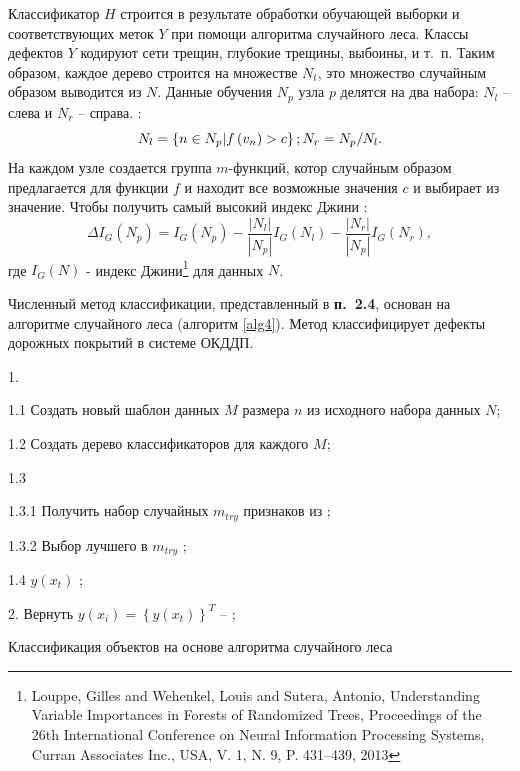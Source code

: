 Классификатор $H$ строится в результате обработки обучающей выборки и соответствующих меток $Y$ при помощи алгоритма случайного леса. Классы дефектов $Y$ кодируют сети трещин, глубокие трещины, выбоины, и т.~п. Таким образом, каждое дерево строится на множестве $N_t$, это множество случайным образом выводится из $N$. Данные обучения $N_p$ узла $p$ делятся на два набора: $N_l$ -- слева и $N_r$ -- справа. :
\begin{equation}\label{eq11}
N_l = \left\{n \in N_p | f\left(v_n\right) > c\right\};  \\
N_r=N_p / N_l.
\end{equation}
На каждом узле создается группа $m$-функций, котор случайным образом предлагается для функции $ f $ и находит все возможные значения $ c $ и  выбирает из  значение. Чтобы получить самый высокий индекс Джини :
\begin{equation}\label{eq12}
\Delta I_G\left(N_p\right)=I_G\left(N_p\right) - \frac{|N_l|}{|N_p|}I_G\left(N_l\right) - \frac{|N_r|}{|N_p|}I_G\left(N_r\right),
\end{equation} где $I_G\left(N\right)$ - индекс Джини\footnote {Louppe, Gilles and Wehenkel, Louis and Sutera, Antonio, Understanding Variable Importances in Forests of Randomized Trees, Proceedings of the 26th International Conference on Neural Information Processing Systems, Curran Associates Inc., USA, V. 1, N. 9, P. 431--439, 2013} для данных  $N$.


Численный метод классификации, представленный в \textbf{п.~2.4}, основан на алгоритме случайного леса (алгоритм \ref{alg4}).  Метод классифицирует дефекты дорожных покрытий в системе ОКДДП.
\begin{algorithm}[ht!]
   1. 
     {
		1.1 Создать новый шаблон данных $M$ размера $n$ из исходного набора данных $N$;

		1.2 Создать дерево классификаторов для каждого $M$;

		1.3 
     {
		  1.3.1 Получить набор случайных  $m_{try}$ признаков из ;

          1.3.2 Выбор лучшего  в $m_{try}$ ;
		}
		1.4 $y\left(x_t\right)$ ;
		}

		2. Вернуть $y\left(x_i\right) = \left\{y\left(x_t\right)\right\}^T$ -- ;

  \caption{Классификация объектов на основе алгоритма случайного леса}\label{alg4}

\end{algorithm}

